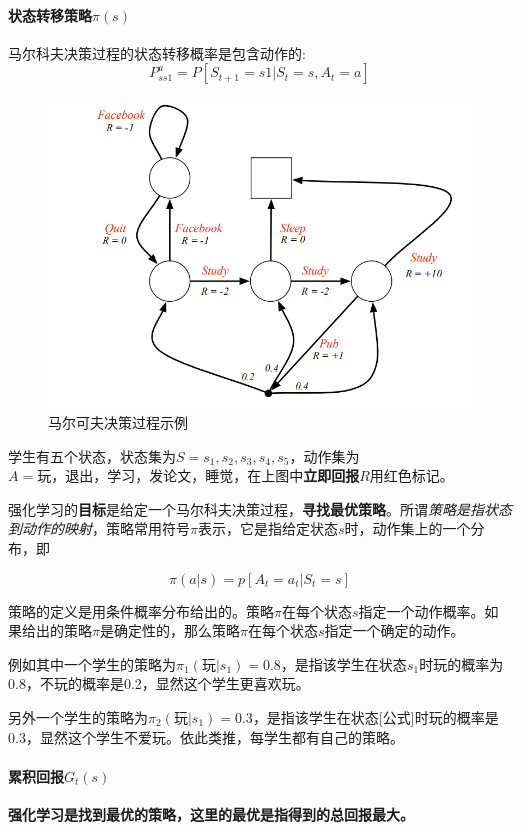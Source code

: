 \documentclass[UTF8,a4paper,12pt]{ctexbook}
\begin{document}
			
			\paragraph{状态转移策略$\pi(s)$}	
				马尔科夫决策过程的状态转移概率是包含动作的:
				$$ P_{ss1}^a = P[S_{t+1} = s1 | S_t = s, A_t = a]$$
				
				\begin{figure}[H]
					\centering
					\includegraphics[width=.6\linewidth]{MDP-example2}
					\caption{马尔可夫决策过程示例}
				\end{figure}			
				
				学生有五个状态，状态集为$S = {s_1, s_2, s_3, s_4, s_5}$，动作集为$A={\textit{玩}，\textit{退出}，\textit{学习}，\textit{发论文}，\textit{睡觉}}$，在上图中\textbf{立即回报}$R$用红色标记。
				
				强化学习的\textbf{目标}是给定一个马尔科夫决策过程，\textbf{寻找最优策略}。所谓\textit{策略是指状态到动作的映射}，策略常用符号$\pi$表示，它是指给定状态$s$时，动作集上的一个分布，即
				
				\begin{equation}
					\pi(a|s) = p[A_t = a_t | S_t = s]
				\end{equation}
				
				策略的定义是用条件概率分布给出的。策略$\pi$在每个状态$s$指定一个动作概率。如果给出的策略$\pi$是确定性的，那么策略$\pi$在每个状态$s$指定一个确定的动作。
				
				例如其中一个学生的策略为$\pi_1(\textit{玩}|s_1) = 0.8$，是指该学生在状态$s_1$时玩的概率为0.8，不玩的概率是0.2，显然这个学生更喜欢玩。
				
				另外一个学生的策略为$\pi_2(\textit{玩}|s_1) = 0.3$，是指该学生在状态[公式]时玩的概率是0.3，显然这个学生不爱玩。依此类推，每学生都有自己的策略。
			
			\paragraph{累积回报$G_t(s)$}	
				\textbf{强化学习是找到最优的策略，这里的最优是指得到的总回报最大。}
				
\end{document}
